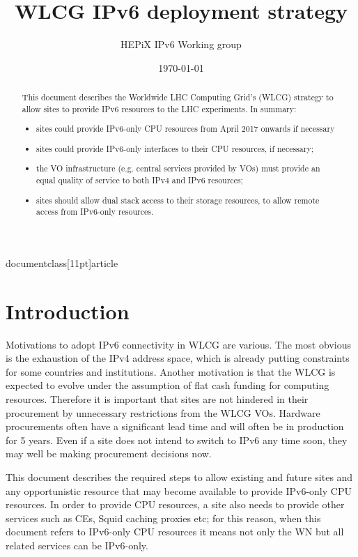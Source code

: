 documentclass[11pt]{article}


\title{WLCG IPv6 deployment strategy}
\author{HEPiX IPv6 Working group}
\date{\today}
\maketitle

\renewcommand{\abstractname}{Executive Summary}
\begin{abstract}
This document describes the Worldwide LHC Computing Grid's (WLCG) strategy to allow sites to provide IPv6 resources to the LHC experiments. In summary:
\begin{itemize}
\item sites could provide IPv6-only CPU resources from April 2017 onwards if necessary
\item sites could provide IPv6-only interfaces to their CPU resources, if necessary;
\item the VO infrastructure (e.g. central services provided by VOs) must provide an equal quality of service to both IPv4 and IPv6 resources;
\item sites should allow dual stack access to their storage resources, to allow remote access from IPv6-only resources.
\end{itemize}
\end{abstract}

\newpage
\tableofcontents
\newpage

\section{Introduction}
Motivations to adopt IPv6 connectivity in WLCG are various. The most
obvious is the exhaustion of the IPv4 address space, which is already
putting constraints for some countries and institutions. Another
motivation is that the WLCG is expected to evolve under the assumption
of flat cash funding for computing resources. Therefore it is
important that sites are not hindered in their procurement by
unnecessary restrictions from the WLCG VOs. Hardware procurements
often have a significant lead time and will often be in production for
5 years.  Even if a site does not intend to switch to IPv6 any time
soon, they may well be making procurement decisions now.

This document describes the required steps to allow existing and
future sites and any opportunistic resource that may become available
to provide IPv6-only CPU resources. In order to provide CPU resources,
a site also needs to provide other services such as CEs, Squid caching
proxies etc; for this reason, when this document refers to IPv6-only
CPU resources it means not only the WN but all related services can be
IPv6-only.

